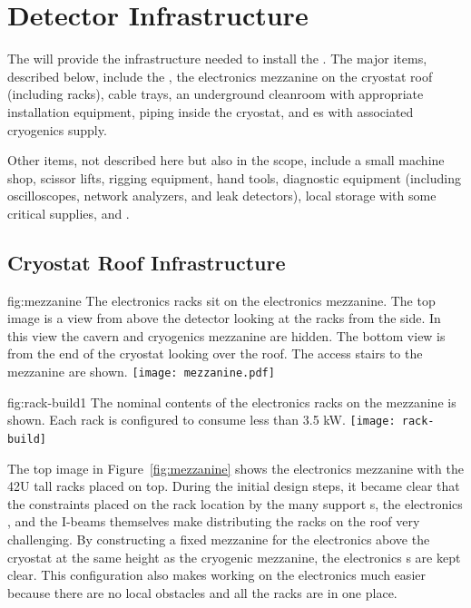 \section{Detector Infrastructure}
\label{sec:fdsp-tc-infr}


The   will provide the infrastructure needed to install the . The major items, described below, include the , the electronics mezzanine on the cryostat roof (including racks), cable trays, an underground cleanroom with appropriate installation equipment, piping inside the cryostat, and \coldbox{}es with associated cryogenics supply. 

Other items, not described here but also in the  scope, include a small machine shop, scissor lifts, rigging equipment, hand tools, diagnostic equipment (including oscilloscopes, network analyzers, and leak detectors), local storage with some critical supplies, and .  



\subsection{Cryostat Roof Infrastructure}
\label{sec:fdsp-tc-infr-cryo-roof}

\begin{dunefigure}{fig:mezzanine}
  {The electronics racks sit on the  electronics mezzanine. The top image is a view from above the detector looking at the racks from the side. In this view the cavern and cryogenics mezzanine are hidden. The bottom view is from the end of the cryostat looking over the roof. The access stairs to the mezzanine are shown.}
 \texttt{[image: mezzanine.pdf]}
\end{dunefigure}

\begin{dunefigure}{fig:rack-build1}
  {The nominal contents of the electronics racks on the mezzanine is shown. Each rack is configured to consume less than 3.5 \si{kW}.  }
 \texttt{[image: rack-build]} 
\end{dunefigure}

The top image in Figure~\ref{fig:mezzanine} shows the  electronics mezzanine with the 42U tall racks placed on top. 
During the initial design steps, it became clear that the constraints placed on the rack location by the many  support \fdth{}s, the electronics \fdth, and the I-beams themselves make distributing the racks on the roof very challenging. 
By constructing a fixed mezzanine for the electronics above the cryostat at the same height as the cryogenic mezzanine, the electronics \fdth{}s are kept clear. 
This configuration also makes working on the electronics much easier because there are no local obstacles and all the racks are in one place.

